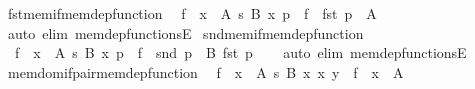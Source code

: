 \begin{isabellebody}
\endisatagproof
{\isafoldproof}%
%
\isadelimproof
\isanewline
%
\endisadelimproof
\isanewline
{}\isamarkupfalse%
\ fst{\isacharunderscore}{\kern0pt}mem{\isacharunderscore}{\kern0pt}if{\isacharunderscore}{\kern0pt}mem{\isacharunderscore}{\kern0pt}dep{\isacharunderscore}{\kern0pt}function{\isacharcolon}{\kern0pt}\isanewline
\ \ {\isachardoublequoteopen}{\isasymlbrakk}f\ {\isasymin}\ {\isacharparenleft}{\kern0pt}x\ {\isasymin}\ A{\isacharparenright}{\kern0pt}\ {\isasymrightarrow}s\ {\isacharparenleft}{\kern0pt}B\ x{\isacharparenright}{\kern0pt}{\isacharsemicolon}{\kern0pt}\ p\ {\isasymin}\ f{\isasymrbrakk}\ {\isasymLongrightarrow}\ fst\ p\ {\isasymin}\ A{\isachardoublequoteclose}\isanewline
%
\isadelimproof
\ \ %
\endisadelimproof
%
\isatagproof
{}\isamarkupfalse%
\ {\isacharparenleft}{\kern0pt}auto\ elim{\isacharbang}{\kern0pt}{\isacharcolon}{\kern0pt}\ mem{\isacharunderscore}{\kern0pt}dep{\isacharunderscore}{\kern0pt}functionsE{\isacharparenright}{\kern0pt}%
\endisatagproof
{\isafoldproof}%
%
\isadelimproof
\isanewline
%
\endisadelimproof
\isanewline
{}\isamarkupfalse%
\ snd{\isacharunderscore}{\kern0pt}mem{\isacharunderscore}{\kern0pt}if{\isacharunderscore}{\kern0pt}mem{\isacharunderscore}{\kern0pt}dep{\isacharunderscore}{\kern0pt}function{\isacharcolon}{\kern0pt}\isanewline
\ \ {\isachardoublequoteopen}{\isasymlbrakk}f\ {\isasymin}\ {\isacharparenleft}{\kern0pt}x\ {\isasymin}\ A{\isacharparenright}{\kern0pt}\ {\isasymrightarrow}s\ {\isacharparenleft}{\kern0pt}B\ x{\isacharparenright}{\kern0pt}{\isacharsemicolon}{\kern0pt}\ p\ {\isasymin}\ f{\isasymrbrakk}\ {\isasymLongrightarrow}\ snd\ p\ {\isasymin}\ B\ {\isacharparenleft}{\kern0pt}fst\ p{\isacharparenright}{\kern0pt}{\isachardoublequoteclose}\isanewline
%
\isadelimproof
\ \ %
\endisadelimproof
%
\isatagproof
{}\isamarkupfalse%
\ {\isacharparenleft}{\kern0pt}auto\ elim{\isacharbang}{\kern0pt}{\isacharcolon}{\kern0pt}\ mem{\isacharunderscore}{\kern0pt}dep{\isacharunderscore}{\kern0pt}functionsE{\isacharparenright}{\kern0pt}%
\endisatagproof
{\isafoldproof}%
%
\isadelimproof
\isanewline
%
\endisadelimproof
\isanewline
{}\isamarkupfalse%
\ mem{\isacharunderscore}{\kern0pt}dom{\isacharunderscore}{\kern0pt}if{\isacharunderscore}{\kern0pt}pair{\isacharunderscore}{\kern0pt}mem{\isacharunderscore}{\kern0pt}dep{\isacharunderscore}{\kern0pt}function{\isacharcolon}{\kern0pt}\isanewline
\ \ {\isachardoublequoteopen}{\isasymlbrakk}f\ {\isasymin}\ {\isacharparenleft}{\kern0pt}x\ {\isasymin}\ A{\isacharparenright}{\kern0pt}\ {\isasymrightarrow}s\ {\isacharparenleft}{\kern0pt}B\ x{\isacharparenright}{\kern0pt}{\isacharsemicolon}{\kern0pt}\ {\isasymlangle}x{\isacharcomma}{\kern0pt}\ y{\isasymrangle}\ {\isasymin}\ f{\isasymrbrakk}\ {\isasymLongrightarrow}\ x\ {\isasymin}\ A{\isachardoublequoteclose}\isanewline

\end{isabellebody}
